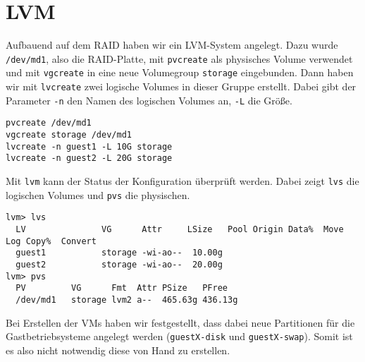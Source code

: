 \section{LVM}
Aufbauend auf dem RAID haben wir ein LVM-System angelegt. Dazu wurde \verb#/dev/md1#, also die RAID-Platte, mit \verb#pvcreate# als physisches Volume verwendet und mit \verb#vgcreate# in eine neue Volumegroup \verb#storage# eingebunden. 
Dann haben wir mit \verb#lvcreate# zwei logische Volumes in dieser Gruppe erstellt. Dabei gibt der Parameter \verb#-n# den Namen des logischen Volumes an, \verb#-L# die Größe. 
\begin{verbatim}
pvcreate /dev/md1 
vgcreate storage /dev/md1
lvcreate -n guest1 -L 10G storage
lvcreate -n guest2 -L 20G storage
\end{verbatim} 
Mit \verb#lvm# kann der Status der Konfiguration überprüft werden. Dabei zeigt \verb#lvs# die logischen Volumes und \verb#pvs# die physischen. 
\setupVerbatimOut
{}
\begin{verbatim}
lvm> lvs
  LV               VG      Attr     LSize   Pool Origin Data%  Move Log Copy%  Convert                                        
  guest1           storage -wi-ao--  10.00g                                           
  guest2           storage -wi-ao--  20.00g                                           
lvm> pvs
  PV         VG      Fmt  Attr PSize   PFree  
  /dev/md1   storage lvm2 a--  465.63g 436.13g
\end{verbatim} 
Bei Erstellen der VMs haben wir festgestellt, dass dabei neue Partitionen für die Gastbetriebsysteme angelegt werden (\verb#guestX-disk# und \verb#guestX-swap#). Somit ist es also nicht notwendig diese von Hand zu erstellen. 

